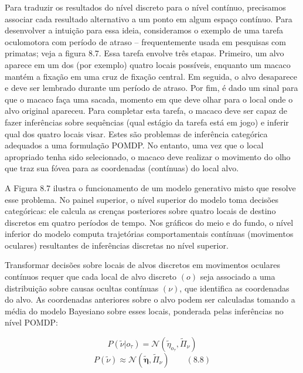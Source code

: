 \documentclass[
  12pt,
]{book}
\begin{document}
Para traduzir os resultados do nível discreto para o nível contínuo, precisamos associar cada resultado alternativo a um ponto em algum espaço contínuo. Para desenvolver a intuição para essa ideia, consideramos o exemplo de uma tarefa oculomotora com período de atraso -- frequentemente usada em pesquisas com primatas; veja a figura 8.7. Essa tarefa envolve três etapas. Primeiro, um alvo aparece em um dos (por exemplo) quatro locais possíveis, enquanto um macaco mantém a fixação em uma cruz de fixação central. Em seguida, o alvo desaparece e deve ser lembrado durante um período de atraso. Por fim, é dado um sinal para que o macaco faça uma sacada, momento em que deve olhar para o local onde o alvo original apareceu. Para completar esta tarefa, o macaco deve ser capaz de fazer inferências sobre sequências (qual estágio da tarefa está em jogo) e inferir qual dos quatro locais visar. Estes são problemas de inferência categórica adequados a uma formulação POMDP. No entanto, uma vez que o local apropriado tenha sido selecionado, o macaco deve realizar o movimento do olho que traz sua fóvea para as coordenadas (contínuas) do local alvo.

A Figura 8.7 ilustra o funcionamento de um modelo generativo misto que resolve esse problema. No painel superior, o nível superior do modelo toma decisões categóricas: ele calcula as crenças posteriores sobre quatro locais de destino discretos em quatro períodos de tempo. Nos gráficos do meio e do fundo, o nível inferior do modelo computa trajetórias comportamentais contínuas (movimentos oculares) resultantes de inferências discretas no nível superior.

Transformar decisões sobre locais de alvos discretos em movimentos oculares contínuos requer que cada local de alvo discreto \((o)\) seja associado a uma distribuição sobre causas ocultas contínuas \((\nu)\), que identifica as coordenadas do alvo. As coordenadas anteriores sobre o alvo podem ser calculadas tomando a média do modelo Bayesiano sobre esses locais, ponderada pelas inferências no nível POMDP:

\[P(\tilde \nu| o_\tau)= \mathcal N(\tilde \eta_{o_{\tau}}, \tilde \Pi_\nu) \]
\[P(\tilde \nu) \approx \mathcal N( \pmb {\tilde \eta}, \tilde \Pi_\nu)  \qquad (8.8)\]
\end{document}
